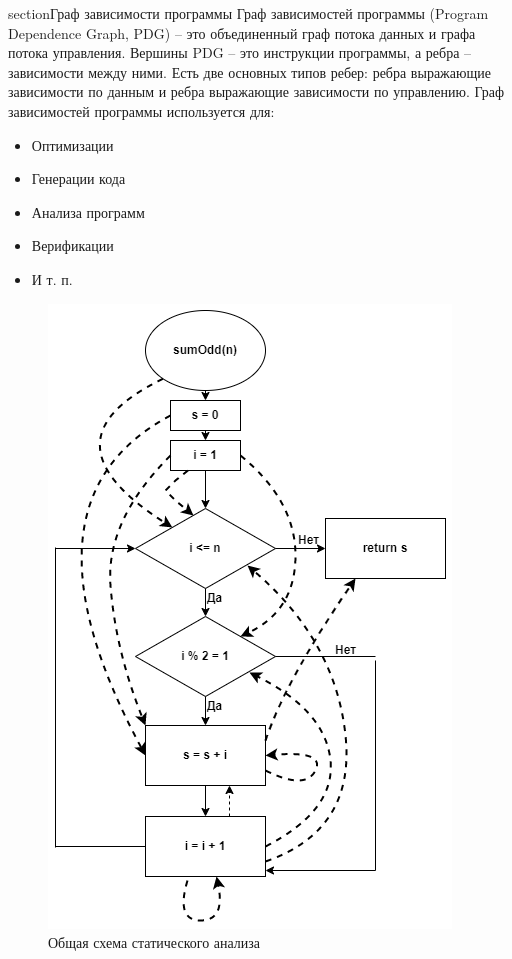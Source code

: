 section{Граф зависимости программы} \label{ch1:sec2-abbr4}
Граф зависимостей программы (Program Dependence Graph, PDG) – это объединенный граф потока данных и графа потока управления. Вершины PDG – это инструкции программы, а ребра – зависимости между ними. Есть две основных типов ребер: ребра выражающие зависимости по данным и ребра выражающие зависимости по управлению.
Граф зависимостей программы используется для:
\begin{itemize}
\item Оптимизации
\item Генерации кода
\item Анализа программ
\item Верификации
\item И т. п.
\end{itemize}	
\begin{figure}[ht!] 
	\center
	\includegraphics [scale=1] {my_folder/images/my/5}
	\caption{Общая схема статического анализа } 
	\label{fig:5}  
\end{figure}
